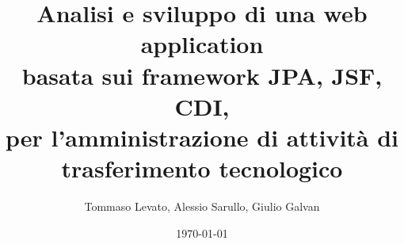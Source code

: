 \documentclass[xcolor=dvipsnames,10pt]{beamer}
\title[Analisi e sviluppo di una web application]{Analisi e sviluppo di una web application \\
basata sui framework JPA, JSF, CDI, \\
per l'amministrazione di attività di trasferimento tecnologico\\}
\author{Tommaso Levato, Alessio Sarullo, Giulio Galvan}
\date{\today}
\begin{document}
\frame{\titlepage}






\end{document}

